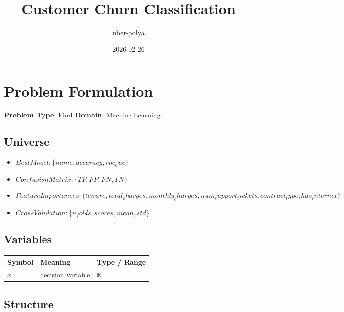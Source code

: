 \documentclass[11pt, a4paper]{article}
\title{Customer Churn Classification}
\author{uber-polya}
\date{2026-02-26}
\begin{document}
\maketitle
\tableofcontents
\newpage

\section{Problem Formulation}

\begin{polyamodel}

\textbf{Problem Type}: Find \hfill
\textbf{Domain}: Machine Learning


\end{polyamodel}

\subsection{Universe}

\begin{itemize}
  \item $Best Model: \{name, accuracy, roc_auc\}$
  \item $Confusion Matrix: \{TP, FP, FN, TN\}$
  \item $Feature Importances: \{tenure, total_charges, monthly_charges, num_support_tickets, contract_type, has_internet\}$
  \item $Cross Validation: \{n_folds, scores, mean, std\}$
\end{itemize}

\subsection{Variables}

\begin{longtable}{lll}
\toprule
\textbf{Symbol} & \textbf{Meaning} & \textbf{Type / Range} \\
\midrule
\endhead
$x$ & decision variable & $\mathbb{{R}}$ \\
\bottomrule
\end{longtable}

\subsection{Structure}
\end{document}
